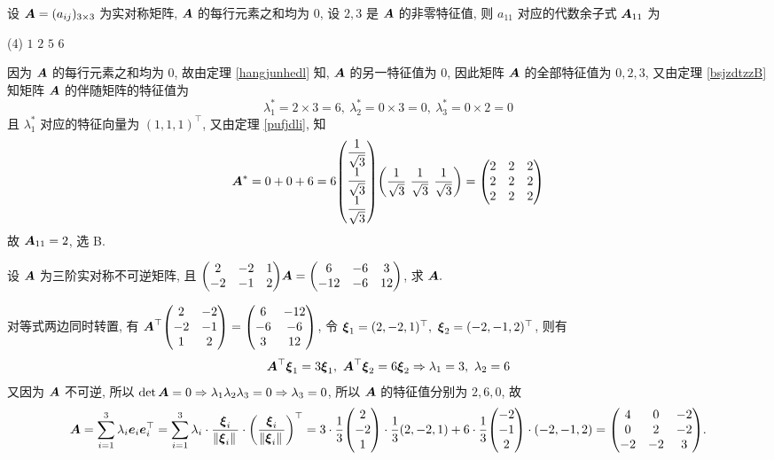 \begin{example}
    设 $\vb*{A}=(a_{ij})_{3\times3}$ 为实对称矩阵, $\vb*{A}$ 的每行元素之和均为 $0$, 设 $2,3$ 是 $\vb*{A}$ 的非零特征值, 则 $a_{11}$ 对应的代数余子式 $\vb*{A}_{11}$ 为
    \begin{tasks}(4)
        \task $1$
        \task $2$
        \task $5$
        \task $6$
    \end{tasks}
\end{example}
\begin{solution}
    因为 $\vb*{A}$ 的每行元素之和均为 $0$, 故由定理 \ref{hangjunhedl} 知, $\vb*{A}$ 的另一特征值为 $0$, 因此矩阵 $\vb*{A}$ 的全部特征值为 $0,2,3$, 又由定理 \ref{bsjzdtzzB} 知矩阵 $\vb*{A}$ 的伴随矩阵的特征值为
    $$\lambda_1^*=2\times3=6,~\lambda_2^*=0\times 3=0,~\lambda_3^*=0\times 2=0$$
    且 $\lambda_1^*$ 对应的特征向量为 $(1,1,1)^\top$, 又由定理 \ref{pufjdli}, 知 $$\vb*{A}^*=0+0+6=6\mqty(\dfrac{1}{\sqrt{3}}\\[6pt]\dfrac{1}{\sqrt{3}}\\[6pt]\dfrac{1}{\sqrt{3}})\qty(\dfrac{1}{\sqrt{3}}~\dfrac{1}{\sqrt{3}}~\dfrac{1}{\sqrt{3}})=\mqty(2&2&2\\2&2&2\\2&2&2)$$
    故 $\vb*{A}_{11}=2$, 选 B.
\end{solution}

\begin{example}
    设 $\vb*{A}$ 为三阶实对称不可逆矩阵, 且 $\mqty(2&-2&1\\-2&-1&2)\vb*{A}=\mqty(6&-6&3\\-12&-6&12)$, 求 $\vb*{A}.$
\end{example}
\begin{solution}
    对等式两边同时转置, 有 $\vb*{A}^\top\mqty(2&-2\\-2&-1\\1&2)=\mqty(6&-12\\-6&-6\\3&12)$, 令 $\vb*{\xi}_1=(2,-2,1)^\top,~\vb*{\xi}_2=(-2,-1,2)^\top$, 则有 $$\vb*{A}^\top\vb*{\xi}_1=3\vb*{\xi}_1,~\vb*{A}^\top\vb*{\xi}_2=6\vb*{\xi}_2\Rightarrow \lambda_1=3,~\lambda_2=6$$
    又因为 $\vb*{A}$ 不可逆, 所以 $\det\vb*{A}=0\Rightarrow \lambda_1\lambda_2\lambda_3=0\Rightarrow \lambda_3=0$, 所以 $\vb*{A}$ 的特征值分别为 $2,6,0$, 故
    $$\vb*{A}=\sum_{i=1}^{3}\lambda_i\vb*{e}_i\vb*{e}_i^\top=\sum_{i=1}^{3}\lambda_i\cdot\dfrac{\vb*{\xi}_i}{\norm*{\vb*{\xi}_i}}\cdot\qty(\dfrac{\vb*{\xi}_i}{\norm*{\vb*{\xi}_i}})^\top=3\cdot\dfrac{1}{3}\mqty(2\\-2\\1)\cdot\dfrac{1}{3}(2,-2,1)+6\cdot\dfrac{1}{3}\mqty(-2\\-1\\2)\cdot(-2,-1,2)=\mqty(4&0&-2\\0&2&-2\\-2&-2&3).$$
\end{solution}

